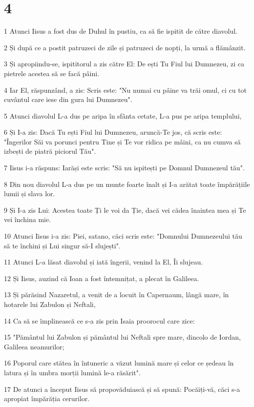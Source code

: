 \chapter{4}

\par 1 Atunci Iisus a fost dus de Duhul în pustiu, ca să fie ispitit de către diavolul.
\par 2 Și după ce a postit patruzeci de zile și patruzeci de nopți, la urmă a flămânzit.
\par 3 Și apropiindu-se, ispititorul a zis către El: De ești Tu Fiul lui Dumnezeu, zi ca pietrele acestea să se facă pâini.
\par 4 Iar El, răspunzând, a zis: Scris este: "Nu numai cu pâine va trăi omul, ci cu tot cuvântul care iese din gura lui Dumnezeu".
\par 5 Atunci diavolul L-a dus pe aripa în sfânta cetate, L-a pus pe aripa templului,
\par 6 Și I-a zis: Dacă Tu ești Fiul lui Dumnezeu, aruncă-Te jos, că scris este: "Îngerilor Săi va porunci pentru Tine și Te vor ridica pe mâini, ca nu cumva să izbești de piatră piciorul Tău".
\par 7 Iisus i-a răspuns: Iarăși este scris: "Să nu ispitești pe Domnul Dumnezeul tău".
\par 8 Din nou diavolul L-a dus pe un munte foarte înalt și I-a arătat toate împărățiile lumii și slava lor.
\par 9 Și I-a zis Lui: Acestea toate Ți le voi da Ție, dacă vei cădea înaintea mea și Te vei închina mie.
\par 10 Atunci Iisus i-a zis: Piei, satano, căci scris este: "Domnului Dumnezeului tău să te închini și Lui singur să-I slujești".
\par 11 Atunci L-a lăsat diavolul și iată îngerii, venind la El, Îi slujeau.
\par 12 Și Iisus, auzind că Ioan a fost întemnițat, a plecat în Galileea.
\par 13 Și părăsind Nazaretul, a venit de a locuit în Capernaum, lângă mare, în hotarele lui Zabulon și Neftali,
\par 14 Ca să se împlinească ce s-a zis prin Isaia proorocul care zice:
\par 15 "Pământul lui Zabulon și pământul lui Neftali spre mare, dincolo de Iordan, Galileea neamurilor;
\par 16 Poporul care stătea în întuneric a văzut lumină mare și celor ce ședeau în latura și în umbra morții lumină le-a răsărit".
\par 17 De atunci a început Iisus să propovăduiască și să spună: Pocăiți-vă, căci s-a apropiat împărăția cerurilor.
